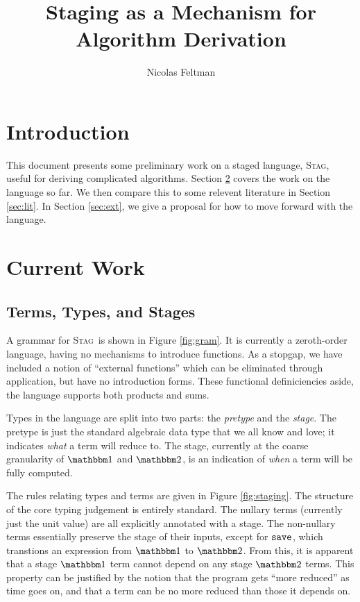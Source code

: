 \documentclass[11pt]{article}
\title{\Large\textbf{Staging as a Mechanism for Algorithm Derivation}}
\author{Nicolas Feltman}
\newcommand {\bbone} {\mathbbm 1}
\newcommand {\bbtwo} {\mathbbm 2}
\newcommand {\pause} {{\tt save}}
\newcommand {\wstage} {\textsc{Stag}}
\begin{document}
\maketitle

\section{Introduction}

This document presents some preliminary work on a staged language, \wstage, useful for deriving complicated algorithms.  Section \ref{sec:current} covers the work on the language so far.  We then compare this to some relevent literature in Section \ref{sec:lit}.  In Section \ref{sec:ext}, we give a proposal for how to move forward with the language.

\section{Current Work}
\label{sec:current}

\subsection{Terms, Types, and Stages}
A grammar for \wstage~is shown in Figure \ref{fig:gram}.  It is currently a zeroth-order language, having no mechanisms to introduce functions.  As a stopgap, we have included a notion of ``external functions'' which can be eliminated through application, but have no introduction forms.  These functional definiciencies aside, the language supports both products and sums.

Types in the language are split into two parts: the {\it pretype} and the {\it stage}.  The pretype is just the standard algebraic data type that we all know and love; it indicates {\it what} a term will reduce to.  The stage, currently at the coarse granularity of $\bbone$ and $\bbtwo$, is an indication of {\it when} a term will be fully computed.

The rules relating types and terms are given in Figure \ref{fig:staging}.  The structure of the core typing judgement is entirely standard.  The nullary terms (currently just the unit value) are all explicitly annotated with a stage.  The non-nullary terms essentially preserve the stage of their inputs, except for $\pause$, which transtions an expression from $\bbone$ to $\bbtwo$.  From this, it is apparent that a stage $\bbone$ term cannot depend on any stage $\bbtwo$ terms.  This property can be justified by the notion that the program gets ``more reduced'' as time goes on, and that a term can be no more reduced than those it depends on.
\end{document}
